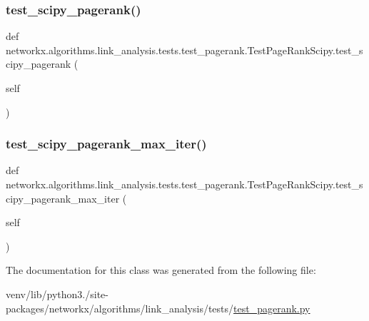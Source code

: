 \subsubsection{\texorpdfstring{test\+\_\+scipy\+\_\+pagerank()}{test\_scipy\_pagerank()}}
{\footnotesize\ttfamily def networkx.\+algorithms.\+link\+\_\+analysis.\+tests.\+test\+\_\+pagerank.\+Test\+Page\+Rank\+Scipy.\+test\+\_\+scipy\+\_\+pagerank (\begin{DoxyParamCaption}\item[{}]{self }\end{DoxyParamCaption})}

\mbox{\label{classnetworkx_1_1algorithms_1_1link__analysis_1_1tests_1_1test__pagerank_1_1TestPageRankScipy_afa558eb1f7d90ff4ab3643d2a841ddb1}} 
\subsubsection{\texorpdfstring{test\+\_\+scipy\+\_\+pagerank\+\_\+max\+\_\+iter()}{test\_scipy\_pagerank\_max\_iter()}}
{\footnotesize\ttfamily def networkx.\+algorithms.\+link\+\_\+analysis.\+tests.\+test\+\_\+pagerank.\+Test\+Page\+Rank\+Scipy.\+test\+\_\+scipy\+\_\+pagerank\+\_\+max\+\_\+iter (\begin{DoxyParamCaption}\item[{}]{self }\end{DoxyParamCaption})}



The documentation for this class was generated from the following file\+:\begin{DoxyCompactItemize}
\item 
venv/lib/python3./site-\/packages/networkx/algorithms/link\+\_\+analysis/tests/\hyperlink{test__pagerank_8py}{test\+\_\+pagerank.\+py}\end{DoxyCompactItemize}
